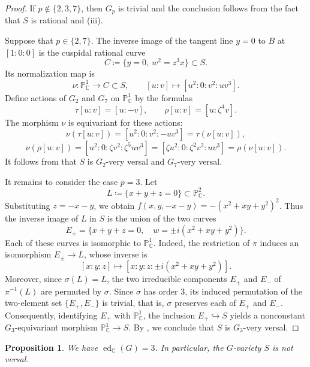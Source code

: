 \documentclass{amsart}
\newtheorem{prop}[prop]{Proposition}
\theoremstyle{definition}
\theoremstyle{remark}
\numberwithin{equation}{section}
\newcommand{\C}{\mathbb C}
\renewcommand{\P}{\mathbb P}
\newcommand{\ed}{\operatorname{ed}}
\begin{document}
\begin{proof}
If $p\notin\{2,3,7\}$, then $G_p$ is trivial and the conclusion follows from the fact that $S$ is rational and (iii).

Suppose that $p\in\{2,7\}$. The inverse image of the tangent line
$y=0$ to $B$ at $[1:0:0]$ is the cuspidal rational curve
\[
 C\coloneqq\{y=0,\ w^2=z^3x\}\subset S.
\]
Its normalization map is
\[
 \nu:\mathbb P^1_\C\longrightarrow C\subset S,
 \qquad
 [u:v]\longmapsto[u^2:0:v^2:uv^3].
\]
Define actions of $G_2$ and $G_7$ on $\P^1_\C$ by the formulas
\[
 \tau[u:v]=[u:-v],
 \qquad
 \rho[u:v]=[u:\zeta^4v].
\]
The morphism $\nu$ is equivariant for these actions:
\[
 \nu(\tau[u:v])
 =[u^2:0:v^2:-uv^3]
 =\tau(\nu[u:v]),
\]
\[
 \nu(\rho[u:v])
 =[u^2:0:\zeta v^2:\zeta^5uv^3]
 =[\zeta u^2:0:\zeta^2v^2:uv^3]
 =\rho(\nu[u:v]).
\]
It follows from
 that $S$ is $G_2$-very versal and
$G_7$-very versal.

It remains to consider the case $p=3$. Let
\[
 L\coloneqq\{x+y+z=0\}\subset\mathbb P^2_\C.
\]
Substituting $z=-x-y$, we obtain $f(x,y,-x-y)=-(x^2+xy+y^2)^2$. Thus the inverse image of $L$ in $S$ is the union of the two curves
\[
 E_\pm=
 \{x+y+z=0,\quad w=\pm i(x^2+xy+y^2)\}.
\]
Each of these curves is isomorphic to $\mathbb P^1_\C$. Indeed, the
restriction of $\pi$ induces an isomorphism $E_\pm\to L$, whose inverse is
\[
 [x:y:z]\longmapsto
 [x:y:z:\pm i(x^2+xy+y^2)].
\]
Moreover, since $\sigma(L)=L$, the two irreducible components $E_+$ and $E_-$ of $\pi^{-1}(L)$ are permuted by $\sigma$. Since $\sigma$ has order $3$, its induced permutation of the two-element set $\{E_+,E_-\}$ is trivial, that is, $\sigma$ preserves each of $E_+$ and
$E_-$. Consequently, identifying $E_+$ with $\mathbb P^1_\C$, the inclusion $E_+\hookrightarrow S$ yields a nonconstant $G_3$-equivariant morphism $\mathbb P^1_\C\to S$. By , we conclude that $S$ is $G_3$-very versal.
\end{proof}



\begin{prop}\label{prop:ed-nonversal}
We have $\ed_{\C}(G)=3$. In particular, the $G$-variety $S$ is not versal.
\end{prop}
\end{document}
